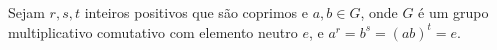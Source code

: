 Sejam \(r,s,t\) inteiros positivos que são coprimos e \(a,b \in G\), onde \(G\) é um grupo multiplicativo comutativo com elemento neutro \(e\), e \(a^r=b^s=(ab)^t=e\). 

